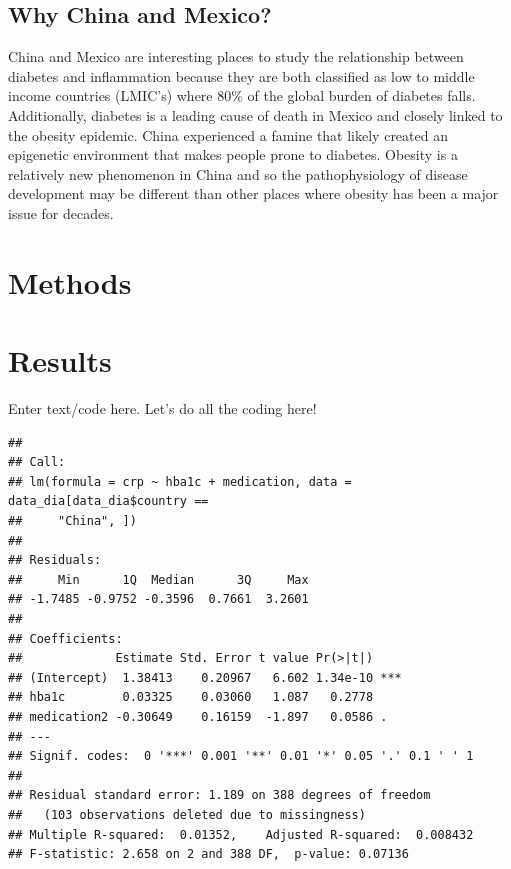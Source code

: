 \documentclass[
  man,floatsintext]{apa6}
\begin{document}
\hypertarget{why-china-and-mexico}{%
\subsection{Why China and Mexico?}\label{why-china-and-mexico}}

China and Mexico are interesting places to study the relationship between diabetes and inflammation because they are both classified as low to middle income countries (LMIC's) where 80\% of the global burden of diabetes falls. Additionally, diabetes is a leading cause of death in Mexico and closely linked to the obesity epidemic. China experienced a famine that likely created an epigenetic environment that makes people prone to diabetes. Obesity is a relatively new phenomenon in China and so the pathophysiology of disease development may be different than other places where obesity has been a major issue for decades.

\hypertarget{methods}{%
\section{Methods}\label{methods}}

\hypertarget{results}{%
\section{Results}\label{results}}

Enter text/code here. Let's do all the coding here!

\begin{verbatim}
## 
## Call:
## lm(formula = crp ~ hba1c + medication, data = data_dia[data_dia$country == 
##     "China", ])
## 
## Residuals:
##     Min      1Q  Median      3Q     Max 
## -1.7485 -0.9752 -0.3596  0.7661  3.2601 
## 
## Coefficients:
##             Estimate Std. Error t value Pr(>|t|)    
## (Intercept)  1.38413    0.20967   6.602 1.34e-10 ***
## hba1c        0.03325    0.03060   1.087   0.2778    
## medication2 -0.30649    0.16159  -1.897   0.0586 .  
## ---
## Signif. codes:  0 '***' 0.001 '**' 0.01 '*' 0.05 '.' 0.1 ' ' 1
## 
## Residual standard error: 1.189 on 388 degrees of freedom
##   (103 observations deleted due to missingness)
## Multiple R-squared:  0.01352,    Adjusted R-squared:  0.008432 
## F-statistic: 2.658 on 2 and 388 DF,  p-value: 0.07136
\end{verbatim}
\end{document}
